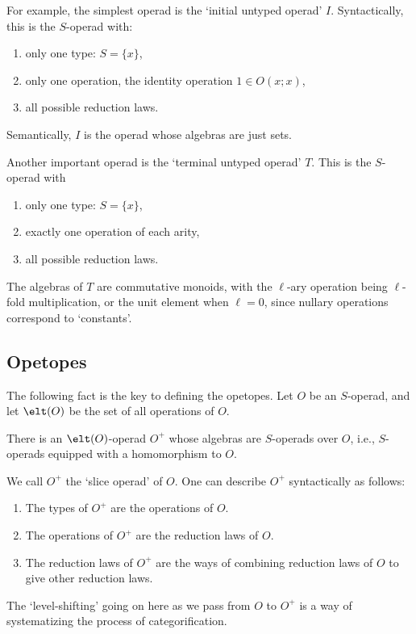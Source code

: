 For example, the simplest operad is the `initial untyped operad' $I$.
Syntactically, this is the $S$-operad with:
\begin{enumerate}
\item only one type: $S = \{x\}$,
\item only one operation, the identity operation $1 \in O(x;x)$,
\item all possible reduction laws.
\end{enumerate}
Semantically, $I$ is the operad whose algebras are just sets.

Another important operad is the `terminal untyped operad' $T$.  
This is the $S$-operad with 
\begin{enumerate}
\item only one type: $S = \{x\}$,
\item exactly one operation of each arity,
\item all possible reduction laws.
\end{enumerate}
The algebras of $T$ are commutative monoids, with the $\ell$-ary
operation being $\ell$-fold multiplication, or the unit element when
$\ell = 0$, since nullary operations correspond to `constants'.

\subsection{Opetopes}

The following fact is the key to defining the opetopes.  Let $O$ be an
$S$-operad, and let $\elt(O)$ be the set of all operations of $O$.

\begin{thm}\et There is an $\elt(O)$-operad $O^+$ whose algebras are
$S$-operads over $O$, i.e., $S$-operads equipped with a homomorphism to
$O$.  \end{thm}

\noindent We call $O^+$ the `slice operad' of $O$.  One can describe 
$O^+$ syntactically as follows:
\begin{enumerate}
\item The types of $O^+$ are the operations of $O$.
\item The operations of $O^+$ are the reduction laws of $O$.
\item The reduction laws of $O^+$ are the ways of combining reduction
laws of $O$ to give other reduction laws.
\end{enumerate}
The `level-shifting' going on here as we pass from $O$ to $O^+$ is a way
of systematizing the process of categorification.  

